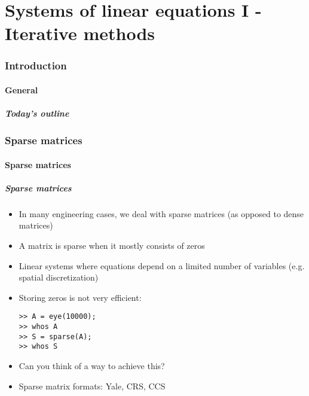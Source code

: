 \part{Systems of linear equations I - Iterative methods}
\section{Introduction}
\subsection*{General}
\begin{frame}[label=contents_lin3]
  \frametitle{Today's outline}
\end{frame}

\section{Sparse matrices}
\subsection*{Sparse matrices}

\begin{frame}[fragile]
  \frametitle{Sparse matrices}
  \begin{itemize}
    \item In many engineering cases, we deal with sparse matrices (as opposed to dense matrices)
    \item A matrix is sparse when it mostly consists of zeros
    \item Linear systems where equations depend on a limited number of variables (e.g. spatial discretization)
    \item Storing zeros is not very efficient:
    \begin{lstlisting}
>> A = eye(10000);
>> whos A
>> S = sparse(A);
>> whos S
    \end{lstlisting}
    \item Can you think of a way to achieve this?
    \item Sparse matrix formats: Yale, CRS, CCS
\end{itemize}
\end{frame}

